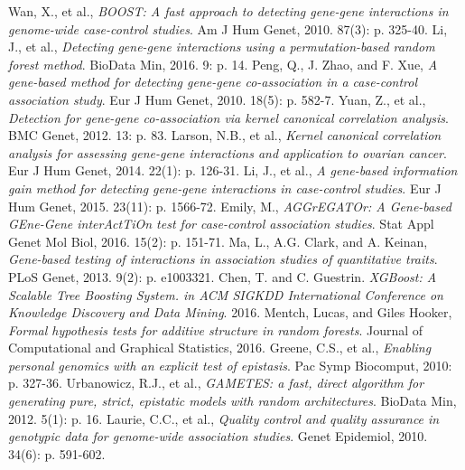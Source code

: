 \documentclass[11pt]{article}
\theoremstyle{plain}
\theoremstyle{definition}
\theoremstyle{remark}
\begin{document}
\begin{thebibliography}{9}
Wan, X., et al., {\em BOOST: A fast approach to detecting gene-gene interactions in genome-wide case-control studies}. Am J Hum Genet, 2010. 87(3): p. 325-40.
Li, J., et al., {\em Detecting gene-gene interactions using a permutation-based random forest method}. BioData Min, 2016. 9: p. 14.
Peng, Q., J. Zhao, and F. Xue, {\em A gene-based method for detecting gene-gene co-association in a case-control association study}. Eur J Hum Genet, 2010. 18(5): p. 582-7.
Yuan, Z., et al., {\em Detection for gene-gene co-association via kernel canonical correlation analysis}. BMC Genet, 2012. 13: p. 83.
Larson, N.B., et al., {\em Kernel canonical correlation analysis for assessing gene-gene interactions and application to ovarian cancer}. Eur J Hum Genet, 2014. 22(1): p. 126-31.
Li, J., et al., {\em A gene-based information gain method for detecting gene-gene interactions in case-control studies}. Eur J Hum Genet, 2015. 23(11): p. 1566-72.
Emily, M., {\em AGGrEGATOr: A Gene-based GEne-Gene interActTiOn test for case-control association studies}. Stat Appl Genet Mol Biol, 2016. 15(2): p. 151-71.
Ma, L., A.G. Clark, and A. Keinan, {\em Gene-based testing of interactions in association studies of quantitative traits}. PLoS Genet, 2013. 9(2): p. e1003321.
Chen, T. and C. Guestrin. {\em XGBoost: A Scalable Tree Boosting System. in ACM SIGKDD International Conference on Knowledge Discovery and Data Mining}. 2016.
Mentch, Lucas, and Giles Hooker, {\em Formal hypothesis tests for additive structure in random forests}. Journal of Computational and Graphical Statistics, 2016.
Greene, C.S., et al., {\em Enabling personal genomics with an explicit test of epistasis}. Pac Symp Biocomput, 2010: p. 327-36.
Urbanowicz, R.J., et al., {\em GAMETES: a fast, direct algorithm for generating pure, strict, epistatic models with random architectures}. BioData Min, 2012. 5(1): p. 16.
Laurie, C.C., et al., {\em Quality control and quality assurance in genotypic data for genome-wide association studies}. Genet Epidemiol, 2010. 34(6): p. 591-602.



\end{thebibliography}
\end{document}
